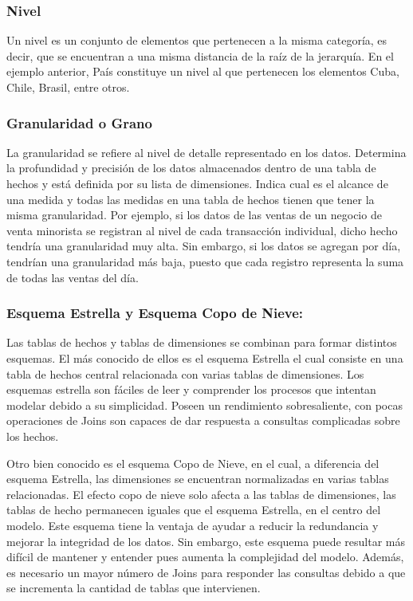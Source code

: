 \subsubsection{Nivel}

Un nivel es un conjunto de elementos que pertenecen a la misma categoría, es decir, que se encuentran a una misma distancia 
de la raíz de la jerarquía. En el ejemplo anterior, Pa\'is constituye un nivel al que pertenecen los elementos Cuba, Chile, 
Brasil, entre otros.

\subsubsection{Granularidad o Grano}

La granularidad se refiere al nivel de detalle representado en los datos. Determina 
la profundidad y precisión de los datos almacenados dentro de una tabla de hechos y est\'a definida por su lista de dimensiones. 
Indica cual es el alcance de una medida y todas las medidas en una tabla de hechos tienen que tener la misma 
granularidad\cite{kimball2011data}. Por ejemplo, si los datos de las ventas de un negocio de venta minorista 
se registran al nivel de cada transacción individual, dicho hecho tendr\'ia una granularidad muy alta. Sin embargo, 
si los datos se agregan por d\'ia, tendrían una granularidad m\'as baja, puesto que cada registro representa la suma 
de todas las ventas del d\'ia.

\subsubsection{Esquema Estrella y Esquema Copo de Nieve:}

Las tablas de hechos y tablas de dimensiones se combinan para formar distintos esquemas. El m\'as conocido 
de ellos es el esquema Estrella el cual consiste en una tabla de hechos central relacionada con varias tablas 
de dimensiones. Los esquemas estrella son f\'aciles de leer y comprender los procesos que intentan modelar debido 
a su simplicidad. Poseen un rendimiento sobresaliente, con pocas operaciones de Joins son capaces de dar respuesta 
a consultas complicadas sobre los hechos.

Otro bien conocido es el esquema Copo de Nieve, en el cual, a diferencia del esquema Estrella, las dimensiones se encuentran 
normalizadas en varias tablas relacionadas. El efecto copo de nieve solo afecta a las tablas de dimensiones, las tablas de hecho 
permanecen iguales que el esquema Estrella, en el centro del modelo. Este esquema tiene la ventaja de ayudar a reducir la redundancia 
y mejorar la integridad de los datos. Sin embargo, este esquema puede resultar m\'as difícil de mantener y entender pues aumenta 
la complejidad del modelo. Adem\'as, es necesario un mayor n\'umero de Joins para responder las consultas debido a que se incrementa
la cantidad de tablas que intervienen.

